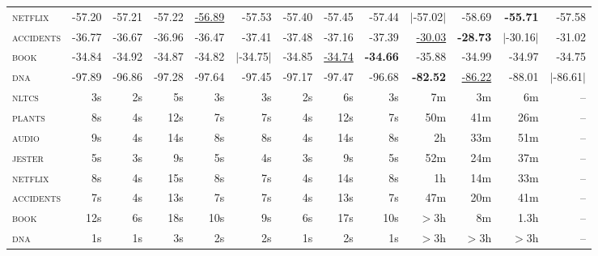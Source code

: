\documentclass[14pt]{ffslides}
\begin{document}
{\begin{tabular}{l|rrrr|rrrr|rrrr}
\textsc{netflix   } &   -57.20 &  -57.21 &  -57.22 & \underline{-56.89} &  -57.53 &  -57.40 &  -57.45 &  -57.44 & $|$-57.02$|$ &  -58.69 & \textbf{-55.71} &  -57.58\\
\textsc{accidents } &   -36.77 &  -36.67 &  -36.96 &  -36.47 &  -37.41 &  -37.48 &  -37.16 &  -37.39 & \underline{-30.03} & \textbf{-28.73} & $|$-30.16$|$ &  -31.02\\
\textsc{book      } &  -34.84 &  -34.92 &  -34.87 &  -34.82 & $|$-34.75$|$ &  -34.85 & \underline{-34.74} & \textbf{-34.66} &  -35.88 &  -34.99 &  -34.97 &  -34.75\\
\textsc{dna       } &  -97.89 &  -96.86 &  -97.28 &  -97.64 &  -97.45 &  -97.17 &  -97.47 &  -96.68 & \textbf{-82.52} & \underline{-86.22} &  -88.01 & $|$-86.61$|$\\
\hline
\textsc{nltcs     } &   3s &   2s &   5s &   3s &   3s &   2s &   6s &   3s & 7m & 3m & 6m & -- \\
\textsc{plants    } &   8s &   4s &  12s &   7s &   7s &   4s &  12s &   7s & 50m & 41m & 26m & -- \\
\textsc{audio     } &   9s &   4s &  14s &   8s &   8s &   4s &  14s &   8s & 2h & 33m & 51m & -- \\
\textsc{jester    } &   5s &   3s &   9s &   5s &   4s &   3s &   9s &   5s & 52m & 24m & 37m & -- \\
\textsc{netflix   } &   8s &   4s &  15s &   8s &   7s &   4s &  14s &   8s & 1h & 14m & 33m & -- \\
\textsc{accidents } &   7s &   4s &  13s &   7s &   7s &   4s &  13s &   7s & 47m & 20m & 41m & -- \\
\textsc{book      } &  12s &   6s &  18s &  10s &   9s &   6s &  17s &  10s & $>$3h & 8m & 1.3h & -- \\
\textsc{dna       } &   1s &   1s &   3s &   2s &   2s &   1s &   2s &   1s & $>$3h & $>$3h & $>$3h & -- \\
\hline
  \end{tabular}
}


\end{document}
